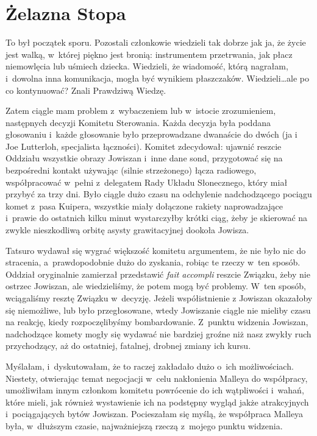 \documentclass[oneside,polish,11pt,sfheadings]{mwbk}
\let\footnote=\endnote
\begin{document}
\chapter{Żelazna Stopa}

To był początek sporu. Pozostali członkowie wiedzieli tak dobrze jak ja,
że życie jest walką, w~której piękno jest bronią: instrumentem
przetrwania, jak płacz niemowlęcia lub uśmiech dziecka. Wiedzieli, że
wiadomość, którą nagrałam, i~dowolna inna komunikacja, mogła być
wynikiem płaszczaków. Wiedzieli\ldots  ale po co kontynuować? Znali
Prawdziwą Wiedzę.

Zatem ciągle mam problem z~wybaczeniem lub w~istocie zrozumieniem,
następnych decyzji Komitetu Sterowania. Każda decyzja była poddana
głosowaniu i~każde głosowanie było przeprowadzane dwanaście do dwóch (ja
i Joe Lutterloh, specjalista łączności). Komitet zdecydował: ujawnić
reszcie Oddziału wszystkie obrazy Jowiszan i~inne dane sond, przygotować
się na bezpośredni kontakt używając (silnie strzeżonego) łącza
radiowego, współpracować w~pełni z~delegatem Rady Układu Słonecznego,
który miał przybyć za trzy dni. Było ciągle dużo czasu na odchylenie
nadchodzącego pociągu komet z~pasa Kuipera, wszystkie miały dołączone
rakiety naprowadzające i~prawie do ostatnich kilku minut wystarczyłby
krótki ciąg, żeby je skierować na zwykle nieszkodliwą orbitę asysty
grawitacyjnej dookoła Jowisza.

Tatsuro wydawał się wygrać większość komitetu argumentem, że nie było
nic do stracenia, a~prawdopodobnie dużo do zyskania, robiąc te rzeczy w~ten sposób. Oddział oryginalnie zamierzał przedstawić \textit{fait
accompli}\footnote{ fr. fakt dokonany -- przyp.tłum.} reszcie Związku, żeby
nie ostrzec Jowiszan, ale wiedzieliśmy, że potem mogą być problemy. W~ten sposób, wciągaliśmy resztę Związku w~decyzję. Jeżeli współistnienie
z Jowiszan okazałoby się niemożliwe, lub było przegłosowane, wtedy
Jowiszanie ciągle nie mieliby czasu na reakcję, kiedy rozpoczęlibyśmy
bombardowanie. Z~punktu widzenia Jowiszan, nadchodzące komety mogły się
wydawać nie bardziej groźne niż nasz zwykły ruch przychodzący, aż do
ostatniej, fatalnej, drobnej zmiany ich kursu.

Myślałam, i~dyskutowałam, że to raczej zakładało dużo o~ich
możliwościach. Niestety, otwierając temat negocjacji w~celu nakłonienia
Malleya do współpracy, umożliwiłam innym członkom komitetu powrócenie do
ich wątpliwości i~wahań, które mieli, jak również wystawienie ich na
podstępny wygląd jakże atrakcyjnych i~pociągających bytów Jowiszan.
Pocieszałam się myślą, że współpraca Malleya była, w~dłuższym czasie,
najważniejszą rzeczą z~mojego punktu widzenia.
\end{document}
